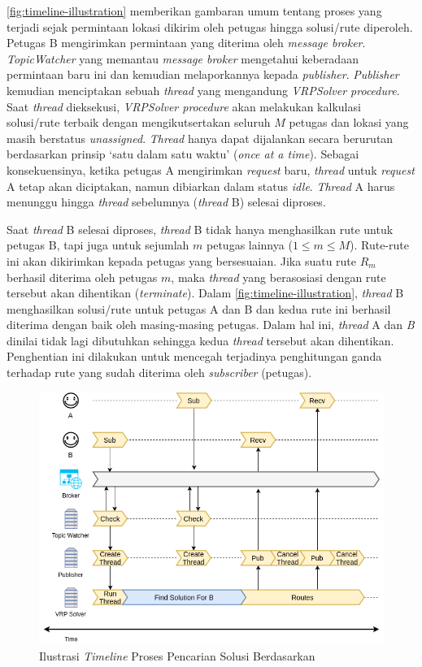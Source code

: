 \autoref{fig:timeline-illustration} memberikan gambaran umum tentang proses yang terjadi sejak permintaan lokasi dikirim oleh petugas hingga solusi/rute diperoleh. Petugas B mengirimkan permintaan yang diterima oleh \textit{message broker}. \textit{TopicWatcher} yang memantau \textit{message broker} mengetahui keberadaan permintaan baru ini dan kemudian melaporkannya kepada \textit{publisher}. \textit{Publisher} kemudian menciptakan sebuah \textit{thread} yang mengandung \textit{VRPSolver procedure}. Saat \textit{thread} dieksekusi, \textit{VRPSolver procedure} akan melakukan kalkulasi solusi/rute terbaik dengan mengikutsertakan seluruh $M$ petugas dan lokasi yang masih berstatus \textit{unassigned}. \textit{Thread} hanya dapat dijalankan secara berurutan berdasarkan prinsip `satu dalam satu waktu' (\textit{once at a time}). Sebagai konsekuensinya, ketika petugas A mengirimkan \textit{request} baru, \textit{thread} untuk \textit{request} A tetap akan diciptakan, namun dibiarkan dalam status \textit{idle}. \textit{Thread} A harus menunggu hingga \textit{thread} sebelumnya (\textit{thread} B) selesai diproses. 

Saat \textit{thread} B selesai diproses, \textit{thread} B tidak hanya menghasilkan rute untuk petugas B, tapi juga untuk sejumlah $m$ petugas lainnya ($1 \leq m \leq M$). Rute-rute ini akan dikirimkan kepada petugas yang bersesuaian. Jika suatu rute $R_m$ berhasil diterima oleh petugas $m$, maka \textit{thread} yang berasosiasi dengan rute tersebut akan dihentikan (\textit{terminate}). Dalam \autoref{fig:timeline-illustration}, \textit{thread} B menghasilkan solusi/rute untuk petugas A dan B dan kedua rute ini berhasil diterima dengan baik oleh masing-masing petugas. Dalam hal ini, \textit{thread} A dan \textit{B} dinilai tidak lagi dibutuhkan sehingga kedua \textit{thread} tersebut akan dihentikan. Penghentian ini dilakukan untuk mencegah terjadinya penghitungan ganda terhadap rute yang sudah diterima oleh \textit{subscriber} (petugas). 


\begin{figure}[!]
	\centering
	\includegraphics[width=\textwidth]{Resources/Images/timeline-illustration}
	\captionsetup{format=hang}
	\caption{Ilustrasi \textit{Timeline} Proses Pencarian Solusi Berdasarkan}
	\label{fig:timeline-illustration}
\end{figure}


